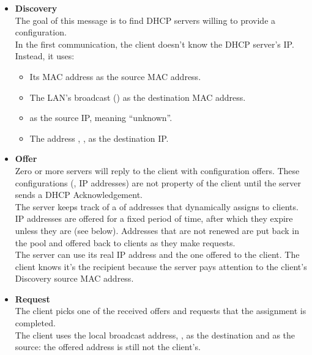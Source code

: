 \begin{itemize}

\item \textbf{Discovery}\\
The goal of this message is to find DHCP servers willing to provide 
a configuration.\\[-0.3cm]

In the first communication, the client 
doesn't know the DHCP server's IP. Instead, it uses:
\begin{itemize}
\item Its MAC address as the source MAC address.
\item The LAN's broadcast () as the destination MAC address.
\item {} as the source IP, meaning ``unknown''.
\item The  address , , as the destination IP.
\end{itemize}

\vspace{0.25cm}
\item \textbf{Offer}\\
Zero or more servers will reply to the client with configuration offers.
These configurations (\eg, IP addresses) are not property of the client 
until the server sends a DHCP Acknowledgement.\\[-0.3cm]

The server keeps track of a  of addresses that dynamically 
assigns to clients.
% 
IP addresses are offered for a fixed period of time, after which they expire
unless they are  (see below). Addresses that are not renewed are put 
back in the pool and offered back to clients as they make requests.
\\[-0.3cm]

The server can use its real IP address and the one offered to the client.
The client knows it's the recipient because the server pays attention to the 
client's Discovery source MAC address.

\vspace{0.25cm}
\item \textbf{Request}\\
The client picks one of the received offers and requests that the 
assignment is completed.\\[-0.3cm]

The client uses the local broadcast
address, , as the destination and 
 as the source: the offered address is still not the client's.


\end{itemize}
